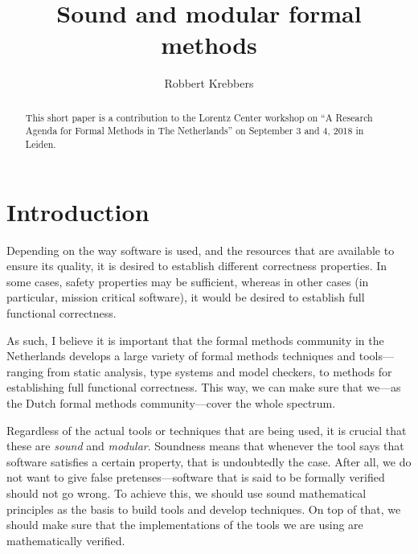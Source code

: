 \documentclass[sigplan]{acmart}
\newcommand{\ie}{\textit{i.e.,}\xspace}
\begin{document}
\title{Sound and modular formal methods}


\author{Robbert Krebbers}

\begin{abstract}
This short paper is a contribution to the Lorentz Center workshop on ``A Research
Agenda for Formal Methods in The Netherlands'' on September 3 and 4, 2018 in
Leiden.
\end{abstract}

\maketitle

\section{Introduction}

Depending on the way software is used, and the resources that are available
to ensure its quality, it is desired to establish different correctness properties.
In some cases, safety properties may be sufficient,
whereas in other cases (in particular, mission critical software), it would
be desired to establish full functional correctness.

As such, I believe it is important that the formal methods community in
the Netherlands develops a large variety of formal methods techniques and
tools---ranging from static analysis, type systems and model checkers, to
methods for establishing full functional correctness.
This way, we can make sure that we---as the Dutch formal methods community---cover the whole spectrum.

Regardless of the actual tools or techniques that are being used, it is
crucial that these are \emph{sound} and \emph{modular}.
Soundness means that whenever the tool says that software satisfies a certain
property, that is undoubtedly the case.
After all, we do not want to give false pretenses---software that is
said to be formally verified should not go wrong.
To achieve this, we should use sound mathematical principles as the basis to
build tools and develop techniques.
On top of that, we should make sure that the implementations of the tools we are
using are mathematically verified.
\end{document}
